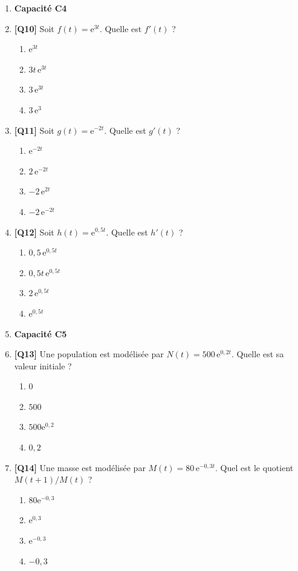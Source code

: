 \begin{enumerate}
\item[] \textbf{Capacité C4}

\item \textbf{[Q10]} Soit $f(t) = \mathrm{e}^{3t}$. Quelle est $f'(t)$ ?
  \begin{enumerate}[label=\Alph*.]
    \item $\mathrm{e}^{3t}$
    \item $3t\,\mathrm{e}^{3t}$
    \item $3\,\mathrm{e}^{3t}$
    \item $3\,\mathrm{e}^{3}$
  \end{enumerate}

\item \textbf{[Q11]} Soit $g(t) = \mathrm{e}^{-2t}$. Quelle est $g'(t)$ ?
  \begin{enumerate}[label=\Alph*.]
    \item $\mathrm{e}^{-2t}$
    \item $2\,\mathrm{e}^{-2t}$
    \item $-2\,\mathrm{e}^{2t}$
    \item $-2\,\mathrm{e}^{-2t}$
  \end{enumerate}

\item \textbf{[Q12]} Soit $h(t) = \mathrm{e}^{0{,}5t}$. Quelle est $h'(t)$ ?
  \begin{enumerate}[label=\Alph*.]
    \item $0{,}5\,\mathrm{e}^{0{,}5t}$
    \item $0{,}5t\,\mathrm{e}^{0{,}5t}$
    \item $2\,\mathrm{e}^{0{,}5t}$
    \item $\mathrm{e}^{0{,}5t}$
  \end{enumerate}

\item[] \textbf{Capacité C5}

\item \textbf{[Q13]} Une population est modélisée par $N(t)=500\,\mathrm{e}^{0{,}2t}$. Quelle est sa valeur initiale ?
  \begin{enumerate}[label=\Alph*.]
    \item $0$
    \item $500$
    \item $500\mathrm{e}^{0{,}2}$
    \item $0{,}2$
  \end{enumerate}

\item \textbf{[Q14]} Une masse est modélisée par $M(t)=80\,\mathrm{e}^{-0{,}3t}$. Quel est le quotient $M(t+1)/M(t)$ ?
  \begin{enumerate}[label=\Alph*.]
    \item $80\mathrm{e}^{-0{,}3}$
    \item $\mathrm{e}^{0{,}3}$
    \item $\mathrm{e}^{-0{,}3}$
    \item $-0{,}3$
  \end{enumerate}


\end{enumerate}
